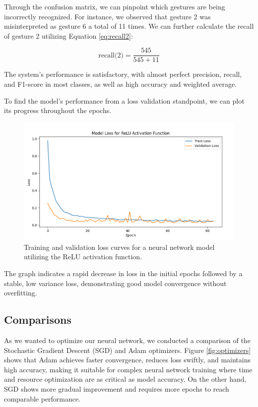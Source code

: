 Through the confusion matrix, we can pinpoint which gestures are being incorrectly recognized. For instance, we observed that gesture 2 was misinterpreted as gesture 6 a total of 11 times. We can further calculate the recall of gesture 2 utilizing Equation \ref{eq:recall2}:

\begin{equation}
	\text{recall(2)} = \frac{545}{545 + 11}
	\label{eq:recall2}
\end{equation}



The system's performance is satisfactory, with almost perfect precision, recall, and F1-score in most classes, as well as high accuracy and weighted average.

To find the model's performance from a loss validation standpoint, we can plot its progress throughout the epochs.
\begin{figure}[ht!]
	\centering
	\includegraphics[width=\textwidth]{images/model_loss_relu.png}
	\caption{Training and validation loss curves for a neural network model utilizing the ReLU activation function.}
	\label{fig:model_loss_relu}
\end{figure}

The graph indicates a rapid decrease in loss in the initial epochs followed by a stable, low variance loss, demonstrating good model convergence without overfitting.

\subsection*{Comparisons}
As we wanted to optimize our neural network, we conducted a comparison of the Stochastic Gradient Descent (SGD) and Adam optimizers. Figure \ref{fig:optimizers} shows that Adam achieves faster convergence, reduces loss swiftly, and maintains high accuracy, making it suitable for complex neural network training where time and resource optimization are as critical as model accuracy. On the other hand, SGD shows more gradual improvement and requires more epochs to reach comparable performance.

